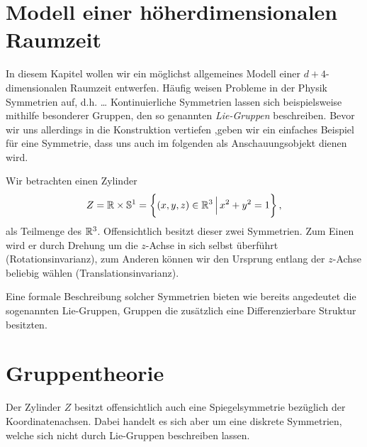 \section{Modell einer höherdimensionalen Raumzeit}
In diesem Kapitel wollen wir ein möglichst allgemeines Modell einer
$d+4$-dimensionalen Raumzeit entwerfen. Häufig weisen Probleme in der Physik
Symmetrien auf, d.h. \ldots
Kontinuierliche Symmetrien lassen sich beispielsweise mithilfe besonderer
Gruppen, den so genannten \emph{Lie-Gruppen} beschreiben.
Bevor wir uns allerdings in die Konstruktion vertiefen ,geben wir ein einfaches
Beispiel für eine Symmetrie, dass uns auch im folgenden als Anschauungsobjekt
dienen wird.
\begin{beispiel}
Wir betrachten einen Zylinder 
\begin{equation}
Z=\Reals\times\Sphere^1=\left\{(x,y,z)\in\Reals^3\,\Big|\,x^2+y^2=1\right\}\,,
\end{equation}
als Teilmenge des $\mathbb{R}^3$. 
Offensichtlich besitzt dieser zwei Symmetrien. Zum Einen wird er durch
Drehung um die $z$-Achse in sich selbst überführt (Rotationsinvarianz), zum
Anderen können wir den Ursprung entlang der $z$-Achse beliebig wählen
(Translationsinvarianz).
\end{beispiel}
Eine formale Beschreibung solcher Symmetrien bieten wie bereits angedeutet die
sogenannten Lie-Gruppen, Gruppen die zusätzlich eine Differenzierbare Struktur
besitzten.
\section{Gruppentheorie}
\begin{definition}

\end{definition}
\begin{bemerkung}
Der Zylinder $Z$ besitzt offensichtlich auch eine Spiegelsymmetrie bezüglich der
Koordinatenachsen. Dabei handelt es sich aber um eine diskrete Symmetrien,
welche sich nicht durch Lie-Gruppen beschreiben lassen.
\end{bemerkung}
% 

